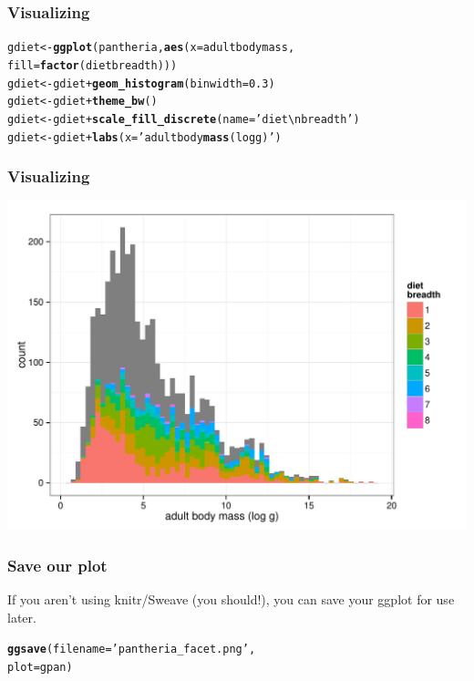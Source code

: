 \documentclass{beamer}\usepackage{graphicx, color}
\makeatletter
\def\maxwidth{ %
  \ifdim\Gin@nat@width>\linewidth
    \linewidth
  \else
    \Gin@nat@width
  \fi
}
\newcommand{\hlfunctioncall}[1]{\textcolor[rgb]{0.501960784313725,0,0.329411764705882}{\textbf{#1}}}%
\newcommand{\hlstring}[1]{\textcolor[rgb]{0.6,0.6,1}{#1}}%
\newenvironment{kframe}{%
 \def\at@end@of@kframe{}%
 \ifinner\ifhmode%
  \def\at@end@of@kframe{\end{minipage}}%
  \begin{minipage}{\columnwidth}%
 \fi\fi%
 \def\FrameCommand##1{\hskip\@totalleftmargin \hskip-\fboxsep
 \colorbox{shadecolor}{##1}\hskip-\fboxsep
     \hskip-\linewidth \hskip-\@totalleftmargin \hskip\columnwidth}%
 \MakeFramed {\advance\hsize-\width
   \@totalleftmargin\z@ \linewidth\hsize
   \@setminipage}}%
 {\par\unskip\endMakeFramed%
 \at@end@of@kframe}
\newenvironment{knitrout}{}{} %
\makeatother
\begin{document}
\begin{frame}[fragile]
  \frametitle{Visualizing}
\begin{knitrout}\scriptsize
{}\color{fgcolor}\begin{kframe}
\begin{alltt}
gdiet <- \hlfunctioncall{ggplot}(pantheria, \hlfunctioncall{aes}(x = adultbodymass,
                               fill = \hlfunctioncall{factor}(dietbreadth)))
gdiet <- gdiet + \hlfunctioncall{geom_histogram}(binwidth = 0.3)
gdiet <- gdiet + \hlfunctioncall{theme_bw}()
gdiet <- gdiet + \hlfunctioncall{scale_fill_discrete}(name = \hlstring{'diet\textbackslash{}nbreadth'})
gdiet <- gdiet + \hlfunctioncall{labs}(x = \hlstring{'adult body \hlfunctioncall{mass} (log g)'})
\end{alltt}
\end{kframe}
\end{knitrout}

\end{frame}

\begin{frame}[fragile]
  \frametitle{Visualizing}
\begin{knitrout}\scriptsize
{}\color{fgcolor}
\includegraphics[width=\maxwidth]{figure/unnamed-chunk-25} 

\end{knitrout}

\end{frame}

\begin{frame}[fragile]
  \frametitle{Save our plot}

  If you aren't using knitr/Sweave (you should!), you can save your ggplot for use later.

\begin{knitrout}\scriptsize
{}\color{fgcolor}\begin{kframe}
\begin{alltt}
\hlfunctioncall{ggsave}(filename = \hlstring{'pantheria_facet.png'},
       plot = gpan)
\end{alltt}
\end{kframe}
\end{knitrout}


\end{frame}
\end{document}

